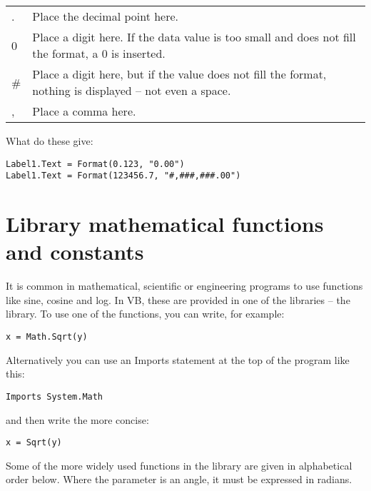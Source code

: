 		\begin{center}
			\begin{tabular}{lp{10cm}}
				\toprule
				.	& Place the decimal point here.\\
				0	& Place a digit here. If the data value is too small and does not fill the format, a 0 is inserted.\\
				\#	& Place a digit here, but if the value does not fill the format, nothing is displayed – not even a space.\\
				, &	Place a comma here.\\ \bottomrule
			\end{tabular}
		\end{center}

		\begin{stqb}
			\begin{STQ}
			\item What do these give:
				\begin{lstlisting}
Label1.Text = Format(0.123, "0.00")
Label1.Text = Format(123456.7, "#,###,###.00")	
				\end{lstlisting}
			\end{STQ}
		\end{stqb}


	\section{Library mathematical functions and constants}
		It is common in mathematical, scientific or engineering programs to use functions like sine, cosine and log. In VB, these are provided in one of the libraries – the  library. To use one of the functions, you can write, for example:
		\begin{lstlisting}
x = Math.Sqrt(y)
		\end{lstlisting}
		Alternatively you can use an Imports statement at the top of the program like this:
		\begin{lstlisting}
Imports System.Math
		\end{lstlisting}
		and then write the more concise:
		\begin{lstlisting}
x = Sqrt(y)
		\end{lstlisting}
		Some of the more widely used functions in the  library are given in alphabetical order below. Where the parameter is an angle, it must be expressed in radians.

